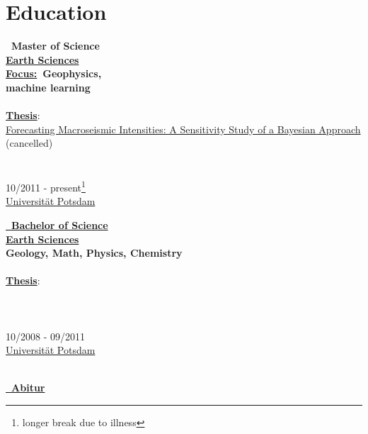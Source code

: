 \documentclass{article}
\begin{document}
\begin{minipage}[t]{0.69\textwidth}
		\section*{\fontsize{18pt}{24pt}\selectfont \color{pblue} Education}
		\begin{minipage}{0.34\textwidth}
	\textbf{\color{pblue}\faHourglassHalf~Master of Science} \\
	\textbf{\underline{Earth Sciences}}\\
	\textbf{\underline{Focus:}~Geophysics, \\machine learning}\\\\
	\textbf{\underline{Thesis}}:\\
	\href{https://github.com/silvioschwarz/master-thesis}{Forecasting Macroseismic Intensities: A Sensitivity Study of a Bayesian Approach} (cancelled)\\\\\\
		10/2011 - present\footnote{longer break due to illness}\\
	\href{https://www.uni-potsdam.de/}{\color{pblue}Universität Potsdam}
		\end{minipage}
		\hfill
		\begin{minipage}{0.3\textwidth}
	\textbf{\href{https://www.dropbox.com/s/297g1chiby8mrd3/Bachelor-Certificate.pdf?dl=0}{\color{pblue}\faGraduationCap~Bachelor of Science}}\\
	\textbf{\underline{Earth Sciences}}\\
	\textbf{Geology, Math, Physics, Chemistry}\\\\
	\textbf{\underline{Thesis}}:\\
	\href{https://www.dropbox.com/s/3kngo4hpb0c47ww/Bachelorarbeit.pdf?dl=0}{}\\\\\\
	{10/2008 - 09/2011}\\
\href{https://www.uni-potsdam.de/}{\color{pblue}Universität Potsdam}\\\\
		\end{minipage}
		\hfill
		\begin{minipage}{0.27\textwidth}
	\textbf{\href{https://www.dropbox.com/s/nsgmvy7o64xb9si/Abiturzeugnis.pdf?dl=0}{\color{pblue}\faGraduationCap~Abitur}}\\

\end{minipage}
\end{minipage}
\end{document}
